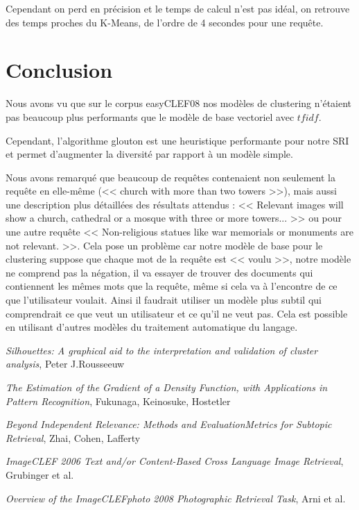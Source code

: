 \documentclass{article}
\begin{document}
Cependant on perd en précision et le temps de calcul n'est pas idéal, on retrouve des temps proches du K-Means, de l'ordre de 4 secondes pour une requête.
\section{Conclusion}

Nous avons vu que sur le corpus easyCLEF08 nos modèles de clustering n'étaient pas beaucoup plus performants que le modèle de base vectoriel avec $tfidf$.

Cependant, l'algorithme glouton est une heuristique performante pour notre SRI et permet d'augmenter la diversité par rapport à un modèle simple.

Nous avons remarqué que beaucoup de requêtes contenaient non seulement la requête en elle-même (<< church with more than two towers >>), mais aussi une description plus détaillées des résultats attendus : << Relevant images will show a church, cathedral or a mosque with three or more towers... >> ou pour une autre requête << Non-religious statues like war memorials or monuments are not relevant. >>. Cela pose un problème car notre modèle de base pour le clustering suppose que chaque mot de la requête est << voulu >>, notre modèle ne comprend pas la négation, il va essayer de trouver des documents qui contiennent les mêmes mots que la requête, même si cela va à l'encontre de ce que l'utilisateur voulait. 
Ainsi il faudrait utiliser un modèle plus subtil qui comprendrait ce que veut un utilisateur et ce qu'il ne veut pas. Cela est possible en utilisant d'autres modèles du traitement automatique du langage.

\begin{thebibliography}{9}
\textit{Silhouettes: A graphical aid to the interpretation and validation of cluster analysis},
Peter J.Rousseeuw

\textit{The Estimation of the Gradient of a Density Function, with Applications in Pattern Recognition}, Fukunaga, Keinosuke, Hostetler

\textit{Beyond Independent Relevance: Methods and EvaluationMetrics for Subtopic Retrieval}, Zhai, Cohen, Lafferty

\textit{ImageCLEF 2006
Text and/or Content-Based Cross Language Image Retrieval}, Grubinger et al.

\textit{Overview of the ImageCLEFphoto 2008  
Photographic Retrieval Task}, Arni et al.
\end{thebibliography}
\end{document}
